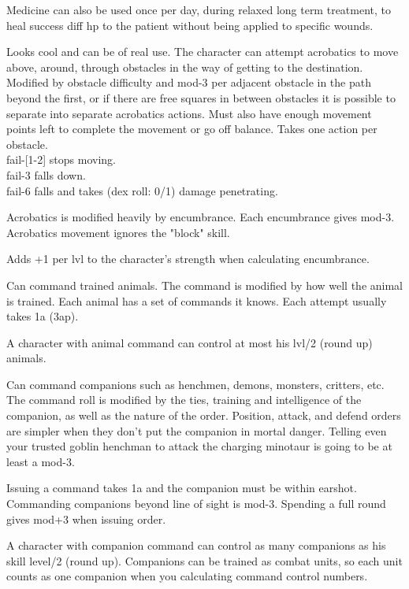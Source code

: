 Medicine can also be used once per day, during relaxed long term treatment, to heal success diff hp to the patient without being applied to specific wounds.


 Looks cool and can be of real use. The character can attempt acrobatics to move above, around, through obstacles in the way of getting to the destination. Modified by obstacle difficulty and mod-3 per adjacent obstacle in the path beyond the first, or if there are free squares in between obstacles it is possible to separate into separate acrobatics actions. Must also have enough movement points left to complete the movement or go off balance. Takes one action per obstacle. \\
fail-[1-2] stops moving. \\
fail-3 falls down. \\
fail-6 falls and takes (dex roll: 0/1) damage penetrating.

Acrobatics is modified heavily by encumbrance. Each encumbrance gives mod-3.
Acrobatics movement ignores the "block" skill.


 Adds +1 per lvl to the character's strength when calculating encumbrance.


 Can command trained animals. The command is modified by how well the animal is trained. Each animal has a set of commands it knows. Each attempt usually takes 1a (3ap).

A character with animal command can control at most his lvl/2 (round up) animals.


 Can command companions such as henchmen, demons, monsters, critters, etc. The command roll is modified by the ties, training and intelligence of the companion, as well as the nature of the order. Position, attack, and defend orders are simpler when they don't put the companion in mortal danger. Telling even your trusted goblin henchman to attack the charging minotaur is going to be at least a mod-3.

Issuing a command takes 1a and the companion must be within earshot. Commanding companions beyond line of sight is mod-3. Spending a full round gives mod+3 when issuing order.

A character with companion command can control as many companions as his skill level/2 (round up). Companions can be trained as combat units, so each unit counts as one companion when you calculating command control numbers.



